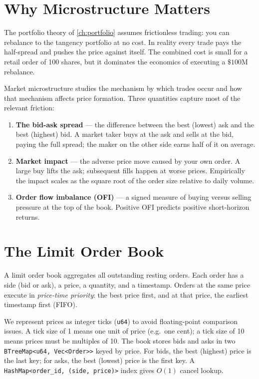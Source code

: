 \section{Why Microstructure Matters}

The portfolio theory of \cref{ch:portfolio} assumes frictionless
trading: you can rebalance to the tangency portfolio at no cost. In
reality every trade pays the half-spread and pushes the price against
itself. The combined cost is small for a retail order of 100 shares,
but it dominates the economics of executing a $\$100$M rebalance.

Market microstructure studies the mechanism by which trades occur and
how that mechanism affects price formation. Three quantities capture
most of the relevant friction:

\begin{enumerate}
    \item \textbf{The bid-ask spread} --- the difference between the
      best (lowest) ask and the best (highest) bid. A market taker
      buys at the ask and sells at the bid, paying the full spread;
      the maker on the other side earns half of it on average.
    \item \textbf{Market impact} --- the adverse price move caused by
      your own order. A large buy lifts the ask; subsequent fills
      happen at worse prices. Empirically the impact scales as the
      square root of the order size relative to daily volume.
    \item \textbf{Order flow imbalance (OFI)} --- a signed measure of
      buying versus selling pressure at the top of the book. Positive
      OFI predicts positive short-horizon returns.
\end{enumerate}

\section{The Limit Order Book}

A limit order book aggregates all outstanding resting orders. Each
order has a side (bid or ask), a price, a quantity, and a timestamp.
Orders at the same price execute in \emph{price-time priority}: the
best price first, and at that price, the earliest timestamp first
(FIFO).

We represent prices as integer ticks (\texttt{u64}) to avoid
floating-point comparison issues. A tick size of 1 means one unit of
price (e.g.\ one cent); a tick size of 10 means prices must be
multiples of 10. The book stores bids and asks in two
\texttt{BTreeMap<u64, Vec<Order>>} keyed by price. For bids, the best
(highest) price is the last key; for asks, the best (lowest) price is
the first key. A \texttt{HashMap<order\_id, (side, price)>} index
gives $O(1)$ cancel lookup.

